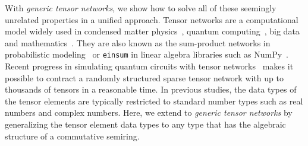\documentclass[onefignum, onetabnum]{siamart190516}
\newcommand{\<}{\langle}
\renewcommand{\>}{\rangle}
\newcommand{\blue}[1]{[{\bf  \color{blue}{JG: #1}}]}
\newcommand{\purple}[1]{[{\bf  \color{purple}{MC: #1}}]}
\newcounter{example}
\begin{document}
With \textit{generic tensor networks}, we show how to solve all of these seemingly unrelated properties in a unified approach. Tensor networks are a computational model widely used in condensed matter physics~\cite{Orus2014}, quantum computing~\cite{Markov2008}, big data~\cite{Cichocki2014} and mathematics~\cite{Oseledets2011}.
They are also known as the sum-product networks in probabilistic modeling~\cite{Bishop2006} or \texttt{einsum} in linear algebra libraries such as NumPy~\cite{Harris2020}.
Recent progress in simulating quantum circuits with tensor networks~\cite{Gray2021, Pan2021, Kalachev2021} makes it possible to contract a randomly structured sparse tensor network with up to thousands of tensors in a reasonable time.
In previous studies, the data types of the tensor elements are typically restricted to standard number types such as real numbers and complex numbers.
Here, we extend to \textit{generic tensor networks} by generalizing the tensor element data types to any type that has the algebraic structure of a commutative semiring.

\end{document}
